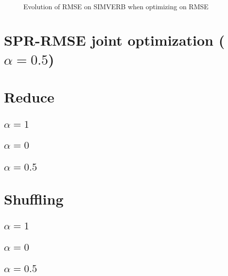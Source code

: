 \documentclass[utf8]{article}
\begin{document}
\begin{figure}[h!tpb]
\begin{minipage}[t]{.48\linewidth}
{
  }
  \caption{Evolution of RMSE on SIMVERB when optimizing on RMSE}
   \end{minipage}
\end{figure}

\section{SPR-RMSE joint optimization ($\alpha=0.5$)}

\section{Reduce}
\subsection{$\alpha=1$}
\subsection{$\alpha=0$}
\subsection{$\alpha=0.5$}


\section{Shuffling}
\subsection{$\alpha=1$}
\subsection{$\alpha=0$}
\subsection{$\alpha=0.5$}
\end{document}
